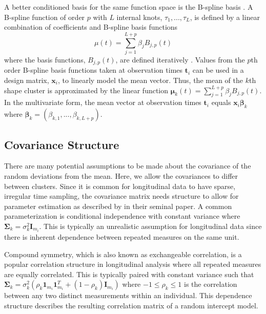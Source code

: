 \documentclass[12pt]{article}
\newcommand{\B}[0]{\mathbf}
\newcommand{\BS}[0]{\boldsymbol}
\begin{document}
A better conditioned basis for the same function space is the B-spline basis \cite{deboor1978, schumaker1981,curry1966, de1976}. A B-spline function of order $p$ with $L$ internal knots, $\tau_{1},...,\tau_{L}$, is defined by a linear combination of coefficients and B-spline basis functions
$$\mu(t) = \sum^{L+p}_{j=1} \beta_j B_{j,p}(t)$$
where the basis functions, $B_{j,p}(t)$, are defined iteratively \cite{deboor1972,cox1972}. Values from the $p$th order B-spline basis functions taken at observation times $\B t_{i}$ can be used in a design matrix, $\B x_{i}$, to linearly model the mean vector. Thus, the mean of the $k$th shape cluster is approximated by the linear function $\BS\mu_{k}(t) = \sum^{L+p}_{j=1} \beta_j B_{j,p}(t)$. In the multivariate form, the mean vector at observation times $\B t_{i}$ equals $\B x_{i}\BS\beta_{k}$ where $\BS\beta_{k}=(\beta_{k,1},...,\beta_{k, L+p}).$  

\subsection{Covariance Structure}
There are many potential assumptions to be made about the covariance of the random deviations from the mean. Here, we allow the covariances to differ between clusters. Since it is common for longitudinal data to have sparse, irregular time sampling, the covariance matrix needs structure to allow for parameter estimation as described by \textcite{jennrich1986} in their seminal paper. A common parameterization is conditional independence with constant variance where $\B \Sigma_{k}= \sigma_{k}^{2}\B I_{m_{i}}$. This is typically an unrealistic assumption for longitudinal data since there is inherent dependence between repeated measures on the same unit. 

Compound symmetry, which is also known as exchangeable correlation, is a popular correlation structure in longitudinal analysis where all repeated measures are equally correlated. This is typically paired with constant variance such that $\B \Sigma_{k} = \sigma_{k}^{2}(\rho_{k}\B1_{m_{i}}\B1_{m_{i}}^{T}+(1-\rho_{k})\B I_{m_{i}})$ where $-1\leq\rho_{k}\leq 1$ is the correlation between any two distinct measurements within an individual. This dependence structure describes the resulting correlation matrix of a random intercept model.
\end{document}
